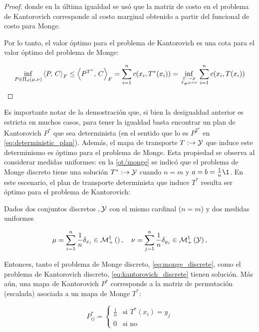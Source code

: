 \begin{proof}
	donde en la última igualdad se usó que la matriz de costo en el problema de Kantorovich corresponde al costo marginal obtenido a partir del funcional de costo para Monge.

	Por lo tanto, el valor óptimo para el problema de Kantorovich es una cota para el valor óptimo del problema de Monge:

	\begin{equation}
		\inf_{P\in \Pi_d(\mu,\nu)} \dotproduct{P}{C}_F
		\leq \dotproduct{P^{T^*}}{C}_F
		= \sum_{i=1}^{n} c(x_i, T^*(x_i))
		= \inf_{\feasible{T:\xspace\to\yspace}{T_\#\mu=\nu}} \sum_{i=1}^n c(x_i,T(x_i))
	\end{equation}
\end{proof}

Es importante notar de la demostración que, si bien la desigualdad anterior es estricta en muchos casos, para tener la igualdad basta encontrar un plan de Kantorovich $P^*$ que sea determinista (en el sentido que lo es $P^{T^*}$ en \eqref{eq:deterministic_plan}). Además, el mapa de transporte $T:\to\mathcal{Y}$ que induce este determinismo es óptimo para el problema de Monge. Esta propiedad se observa al considerar medidas uniformes: en la \autoref{ot/monge} se indicó que el problema de Monge discreto tiene una solución $T^*:\to\mathcal{Y}$ cuando $n=m$ y $a=b=\frac{1}{n}\1$. En este escenario, el plan de transporte determinista que induce $T^*$ resulta ser óptimo para el problema de Kantorovich:

\begin{prop}
	\label{prop:matching_existence}
	Dados dos conjuntos discretos $,\mathcal{Y}$ con el mismo cardinal ($n=m$) y dos medidas uniformes

	\begin{equation}
		\mu = \sum_{i=1}^n \frac{1}{n} \delta_{x_i}\in\mathcal{M}_+^1\left(\right),
		\quad
		\nu = \sum_{j=1}^n \frac{1}{n} \delta_{y_j}\in\mathcal{M}_+^1\left(\mathcal{Y}\right),
	\end{equation}

	Entonces, tanto el problema de Monge discreto, \eqref{eq:monge_discrete}, como el problema de Kantorovich discreto, \eqref{eq:kantorovich_discrete} tienen solución. Más aún, una mapa de Kantorovich $P^*$ corresponde a la matriz de permutación (escalada) asociada a un mapa de Monge $T^*$:

	\begin{equation}
		P_{ij}^* = \begin{cases}
			\frac{1}{n} & \text{si } T^*(x_i) = y_j \\
			0           & \text{si no}
		\end{cases}
	\end{equation}
\end{prop}

